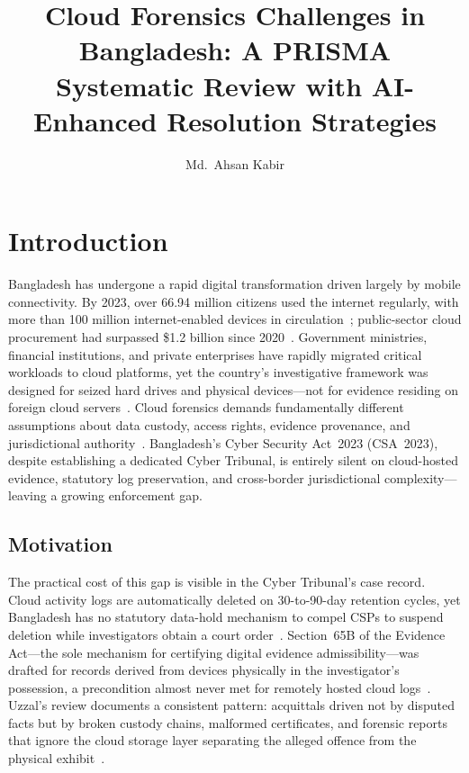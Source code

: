 \documentclass[sigconf,nonacm]{acmart}
\title{Cloud Forensics Challenges in Bangladesh: A PRISMA Systematic Review
       with AI-Enhanced Resolution Strategies}
\author{Md.\ Ahsan Kabir}
\affiliation{%
  \institution{United International University}
  \department{Department of Computer Science and Engineering}
  \city{Dhaka}
  \country{Bangladesh}}
\begin{document}
\maketitle

\section{Introduction}

Bangladesh has undergone a rapid digital transformation driven largely by
mobile connectivity. By 2023, over 66.94 million citizens used the
internet regularly, with more than 100 million internet-enabled devices
in circulation~\cite{sharmin2025}; public-sector cloud procurement had
surpassed \$1.2 billion since 2020~\cite{rana2025}. Government
ministries, financial institutions, and private enterprises have rapidly
migrated critical workloads to cloud platforms, yet the country's
investigative framework was designed for seized hard drives and physical
devices---not for evidence residing on foreign cloud
servers~\cite{ahmed2025}. Cloud forensics demands fundamentally different
assumptions about data custody, access rights, evidence provenance, and
jurisdictional authority~\cite{akter2023}. Bangladesh's Cyber Security
Act~2023 (CSA~2023), despite establishing a dedicated Cyber Tribunal, is
entirely silent on cloud-hosted evidence, statutory log preservation, and
cross-border jurisdictional complexity---leaving a growing enforcement
gap.

\subsection{Motivation}

The practical cost of this gap is visible in the Cyber Tribunal's case
record. Cloud activity logs are automatically deleted on 30-to-90-day
retention cycles, yet Bangladesh has no statutory data-hold mechanism to
compel CSPs to suspend deletion while investigators obtain a court
order~\cite{ali2023}. Section~65B of the Evidence Act---the sole
mechanism for certifying digital evidence admissibility---was drafted for
records derived from devices physically in the investigator's possession,
a precondition almost never met for remotely hosted cloud
logs~\cite{ali2023,uzzal2025}. Uzzal's review documents a consistent
pattern: acquittals driven not by disputed facts but by broken custody
chains, malformed certificates, and forensic reports that ignore the
cloud storage layer separating the alleged offence from the physical
exhibit~\cite{uzzal2025}.
\end{document}
